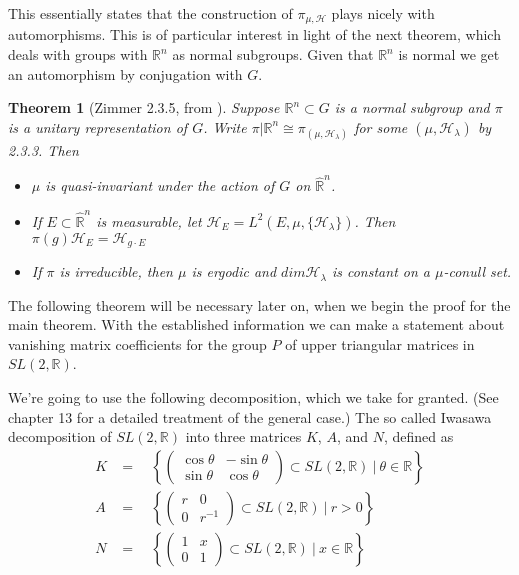 \documentclass[
  12pt
]{article}
\numberwithin{equation}{section}
\newtheorem{thm}{Theorem}[section]
\theoremstyle{plain}
\newcommand{\G}{\ensuremath{G}\xspace}
\newcommand{\bbr}{\ensuremath{\mathbb{R}}\xspace}
\newcommand{\hilb}{\ensuremath{\mathscr{H}}\xspace}
\newcommand{\sltr}{\ensuremath{SL(2, \mathbb{R})}\xspace}
\begin{document}
  This essentially states that the construction of $\pi_{\mu, \hilb}$ plays
  nicely with automorphisms. This is of particular interest in light of the
  next theorem, which deals with groups with $\bbr^n$ as normal subgroups. Given
  that $\bbr^n$ is normal we get an automorphism by conjugation with \G.

  \begin{thm}[Zimmer 2.3.5, from  \cite{mackey76}]
    \label{thm:2.3.5}
    Suppose $\mathbb{R}^n \subset G$ is a normal subgroup and $\pi$ is a unitary representation of $G$.
    Write $\pi | \mathbb{R}^n \cong \pi_{(\mu, \mathscr{H}_{\lambda})}$ for some
    $(\mu, \mathscr{H}_{\lambda})$ by 2.3.3. Then  
    \begin{itemize}
      \item $\mu$ is quasi-invariant under the action of $G$ on $\hat{\mathbb{R}}^n$. 
      \item If $E \subset \hat{\mathbb{R}}^n$ is measurable, let
        $\mathscr{H}_E = L^2(E, \mu, \{\mathscr{H}_{\lambda}\})$.
        Then $\pi(g)\mathscr{H}_E = \mathscr{H}_{g \cdot E}$
      \item If $\pi$ is irreducible, then $\mu$ is ergodic and $dim\mathscr{H}_{\lambda}$ is
        constant on a $\mu$-conull set.
    \end{itemize}
  \end{thm}

  The following theorem will be necessary later on, when we begin the proof for
  the main theorem. With the established information we can make a statement
  about vanishing matrix coefficients for the group $P$ of upper triangular
  matrices in \sltr.


  We're going to use the following decomposition, which we take for
  granted. (See \citeauthor{Hilgert2012}\cite{Hilgert2012} chapter 13 for a detailed treatment of the general case.)
  The so called Iwasawa decomposition of $SL(2, \mathbb{R})$ into three
  matrices $K$, $A$, and $N$, defined as
  \begin{align}
  K & =\quad \left\{ \begin{pmatrix} \cos\theta & -\sin\theta \\ \sin\theta & \cos\theta\end{pmatrix} \subset SL(2, \mathbb{R})  \ | \ \theta \in \mathbb{R} \right\} \\
  A & =\quad \left\{ \begin{pmatrix} r & 0 \\ 0 & r^{-1} \end{pmatrix} \subset SL(2, \mathbb{R})  \ | \ r > 0 \right\} \\
  N & =\quad \left\{ \begin{pmatrix} 1 & x \\ 0 & 1 \end{pmatrix} \subset SL(2, \mathbb{R})  \ | \ x \in \mathbb{R} \right\}\\
  \end{align}
\end{document}

